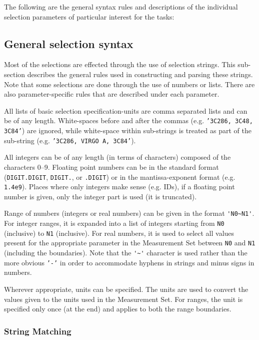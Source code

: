 The following are the general syntax rules and descriptions of the
individual selection parameters of particular interest for the tasks:

\subsection{General selection syntax}
\label{section:io.selection.syntax}

Most of the selections are effected through the use of selection
strings.  This sub-section describes the general rules used in
constructing and parsing these strings.  Note that some selections
are done through the use of numbers or lists.  There are also 
parameter-specific rules that are described under each parameter.

All lists of basic selection specification-units are comma separated
lists and can be of any length.  White-spaces before and after the
commas (e.g. {\tt '3C286, 3C48, 3C84'}) are ignored, while white-space 
within sub-strings is treated as part of the sub-string 
(e.g. {\tt '3C286, VIRGO A, 3C84'}).

All integers can be of any length (in terms of characters) composed of
the characters 0--9.  Floating point numbers can be in the standard
format ({\tt DIGIT.DIGIT}, {\tt DIGIT.}, or {\tt .DIGIT}) or in the 
mantissa-exponent format (e.g. {\tt 1.4e9}).  Places where only 
integers make sense (e.g. IDs), if a floating point number is given, 
only the integer part is used (it is truncated).

Range of numbers (integers or real numbers) can be given in the format
{\verb!'N0~N1'!}.  For integer ranges, it is expanded into a list of integers
starting from {\tt N0} (inclusive) to {\tt N1} (inclusive).  For real numbers, it
is used to select all values present for the appropriate parameter in
the Measurement Set between {\tt N0} and {\tt N1} (including the
boundaries).  Note that the {\verb!'~'!} character is used rather than the
more obvious {\tt '-'} in order to accommodate hyphens in strings and
minus signs in numbers.

Wherever appropriate, units can be specified.  The
units are used to convert the values given to the units used in the
Measurement Set.  For ranges, the unit is specified only once (at
the end) and applies to both the range boundaries.

\subsubsection{String Matching}
\label{section:io.selection.syntax.string}


